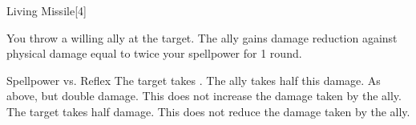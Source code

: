 \begin{spellsection}{Living Missile}[4]
    \begin{spellheader}
    \end{spellheader}
    \begin{spellcontent}
        \begin{spelltargetinginfo}
        \end{spelltargetinginfo}
        \begin{spelleffects}
            \spelleffect You throw a willing ally at the target. The ally gains damage reduction against physical damage equal to twice your spellpower for 1 round.
            \begin{spellattack}{Spellpower vs. Reflex}
                \spellsuccess The target takes . The ally takes half this damage.
                \spellcritical As above, but double damage. This does not increase the damage taken by the ally.
                \spellfailure The target takes half damage. This does not reduce the damage taken by the ally.
            \end{spellattack}
        \end{spelleffects}
    \end{spellcontent}
    \begin{spellfooter}
        \miscastexplode
    \end{spellfooter}
    \begin{spellaugments}
    \end{spellaugments}
\end{spellsection}

